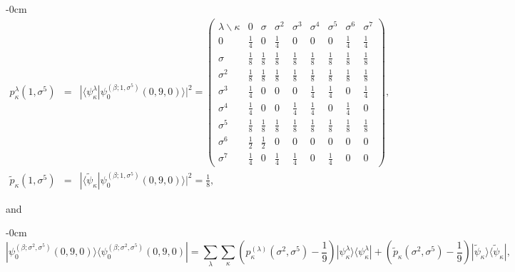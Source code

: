 \documentclass[quantumrep,article,submit,pdftex,moreauthors]{Definitions/mdpi}
\begin{document}
\begin{adjustwidth}{-\extralength}{0cm}
\begin{eqnarray}
  p_{\kappa}^{\lambda}(1,\sigma^{5})
  &=& |\langle \psi_{\kappa }^{\lambda}
  |\psi_{0}^{(\beta ;1,\sigma ^{5})}(0,9,0)\rangle|^{2}
  = \left(\begin{array}{ccccccccc} \lambda \backslash \kappa  & 0 & \sigma  &
      \sigma ^{2} & \sigma ^{3} & \sigma^{4} & \sigma ^{5} & \sigma ^{6} &
      \sigma ^{7} \\ 
    0 & \frac{1}{4} & 0 & \frac{1}{4} & 0 & 0 & 0 & \frac{1}{4} & \frac{1}{4} \\
    [6pt]
    \sigma & \frac{1}{8} & \frac{1}{8} & \frac{1}{8} & \frac{1}{8} & \frac{1}{8}
           & \frac{1}{8} & \frac{1}{8} & \frac{1}{8} \\ [6pt]
    \sigma^{2} & \frac{1}{8} & \frac{1}{8} & \frac{1}{8} & \frac{1}{8} &
    \frac{1}{8} & \frac{1}{8} & \frac{1}{8} & \frac{1}{8} \\  [6pt]
    \sigma^{3} & \frac{1}{4} & 0 & 0 & 0 & \frac{1}{4} & \frac{1}{4} & 0 &
    \frac{1}{4} \\  [6pt] \sigma^{4} & \frac{1}{4} & 0 & 0 & \frac{1}{4} &
    \frac{1}{4} & 0 & \frac{1}{4} & 0 \\  [6pt]
    \sigma^{5} & \frac{1}{8} & \frac{1}{8} & \frac{1}{8} & \frac{1}{8} &
    \frac{1}{8} & \frac{1}{8} & \frac{1}{8} & \frac{1}{8} \\  [6pt] \sigma^{6} &
    \frac{1}{2} & \frac{1}{2} & 0 & 0 & 0 & 0 & 0 & 0 \\  [6pt]
    \sigma^{7} & \frac{1}{4} & 0 & \frac{1}{4} & \frac{1}{4} & 0 & \frac{1}{4} &
    0 & 0
  \end{array}\right), \\
  \tilde{p}_{\kappa }(1,\sigma^{5})
  &=& |\langle \tilde\psi_\kappa | \psi_0^{(\beta;1,\sigma^5)}(0,9,0)\rangle|^2
  = \frac{1}{8},%
\end{eqnarray}
\end{adjustwidth}

and

\begin{adjustwidth}{-\extralength}{0cm}
\begin{equation}
  |\psi_{0}^{(\beta;\sigma^{2},\sigma^{5})}(0,9,0)\rangle
  \langle \psi_{0}^{(\beta ; \sigma^{2},\sigma^{5})}(0,9,0)|
  = \sum_{\lambda }\sum_{\kappa} \left(
    p_{\kappa }^{(\lambda )}\left( \sigma ^{2},\sigma ^{5}\right) -\frac{1}{9}
  \right)
  |\psi_{\kappa}^{\lambda}\rangle \langle \psi_{\kappa}^{\lambda }|
  + \left( \tilde{p}_{\kappa }(\sigma ^{2},\sigma ^{5})-\frac{1}{9} \right)
  |\tilde{\psi}_{\kappa }\rangle \langle \tilde{\psi}_{\kappa }|,
\end{equation}
\end{adjustwidth}
\end{document}
